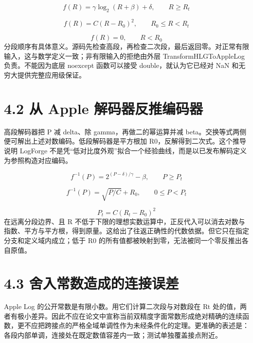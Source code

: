 \documentclass[UTF8,zihao=-4,openany]{ctexbook}
\begin{document}
\begin{equation}
f(R)=\gamma\log_2(R+\beta)+\delta,\qquad R\geq R_t
\end{equation}

\begin{equation}
f(R)=C(R-R_0)^2,\qquad R_0\leq R<R_t
\end{equation}

\begin{equation}
f(R)=0,\qquad R<R_0
\end{equation}
分段顺序有具体意义。源码先检查高段，再检查二次段，最后返回零。对正常有限输入，这与数学定义一致；非有限输入的拒绝由外层 TransformHLGToAppleLog 负责。不能因为底层 noexcept 函数可以接受 double，就认为它已经对 NaN 和无穷大提供完整应用级保证。


\section*{4.2 从 Apple 解码器反推编码器}
高段解码器把 P 减 delta、除 gamma，再做二的幂运算并减 beta。交换等式两侧便可解出上述对数编码。低段解码器是平方根加 R0，反解得到二次式。这个推导说明 LogForge 不是凭“低对比度外观”拟合一个经验曲线，而是以已发布解码定义为参照构造对应编码。


\begin{equation}
f^{-1}(P)=2^{(P-\delta)/\gamma}-\beta,\qquad P\geq P_t
\end{equation}

\begin{equation}
f^{-1}(P)=\sqrt{P/C}+R_0,\qquad 0\leq P<P_t
\end{equation}

\begin{equation}
P_t=C(R_t-R_0)^2
\end{equation}
在远离分段边界、且 R 不低于下限的理想实数运算中，正反代入可以消去对数与指数、平方与平方根，得到原量。这给出了往返正确性的代数依据。但它只在指定分支和定义域内成立；低于 R0 的所有值都被映射到零，无法被同一个零反推出各自原值。


\section*{4.3 舍入常数造成的连接误差}
Apple Log 的公开常数是有限小数。用它们计算二次段与对数段在 Rt 处的值，两者有极小差异。因此不应在论文中宣称当前双精度字面常数形成绝对精确的连续函数，更不应把跨接点的严格全域单调性作为未经条件化的定理。更准确的表述是：各段内部单调，连接处在既定数值容差内一致；测试单独覆盖接点附近。
\end{document}
